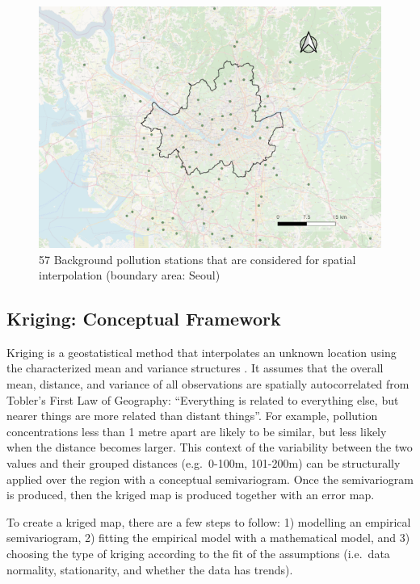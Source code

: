 \begin{figure}[htbp] 
\begin{center} 
    \includegraphics[width=.7\textwidth]{Figures/pollution_stations.png}
\end{center}
 \caption{57 Background pollution stations that are considered for spatial interpolation (boundary area: Seoul)} 
 \label{fig:pollution_stations} 
\end{figure}

\hypertarget{kriging-conceptual-framework}{%
\subsection{Kriging: Conceptual
Framework}\label{kriging-conceptual-framework}}

Kriging is a geostatistical method that interpolates an unknown location
using the characterized mean and variance structures
\citep{Kumar2007, Kim2014}. It assumes that the overall mean, distance,
and variance of all observations are spatially autocorrelated from
Tobler's First Law of Geography: ``Everything is related to everything
else, but nearer things are more related than distant things''. For
example, pollution concentrations less than 1 metre apart are likely to
be similar, but less likely when the distance becomes larger. This
context of the variability between the two values and their grouped
distances (e.g.~0-100m, 101-200m) can be structurally applied over the
region with a conceptual semivariogram. Once the semivariogram is
produced, then the kriged map is produced together with an error map.

To create a kriged map, there are a few steps to follow: 1) modelling an
empirical semivariogram, 2) fitting the empirical model with a
mathematical model, and 3) choosing the type of kriging according to the
fit of the assumptions (i.e.~data normality, stationarity, and whether
the data has trends).

